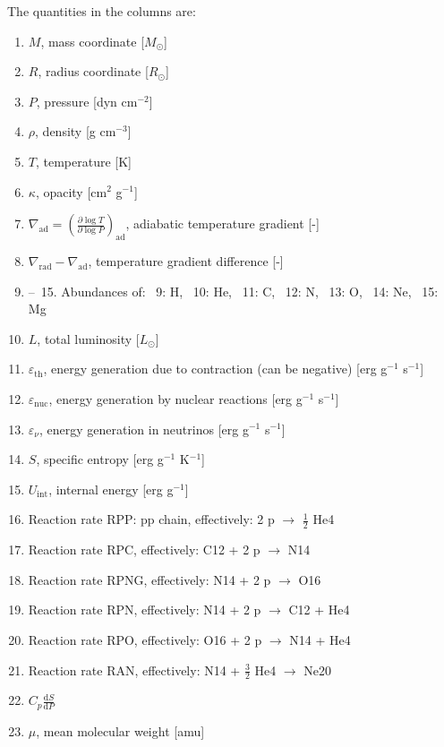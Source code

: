 The quantities in the columns are:
\begin{enumerate}
\item $M$, mass coordinate [$M_\odot$] 
\item $R$, radius coordinate [$R_\odot$] 
\item $P$, pressure [dyn cm$^{-2}$] 
\item $\rho$, density [g cm$^{-3}$]
\item $T$, temperature [K]
\item $\kappa$, opacity [cm$^2$ g$^{-1}$] 
\item $\nabla_\mathrm{ad} = \left(\frac{\partial\log T}{\partial\log P}\right)_\mathrm{ad}$, adiabatic temperature gradient  [-] 
\item $\nabla_\mathrm{rad}-\nabla_\mathrm{ad}$, temperature gradient difference [-]
\item-- \,15. Abundances of:~ 9: H,~ 10: He,~ 11: C,~ 12: N,~ 13: O,~ 14: Ne,~ 15: Mg

\setcounter{enumi}{15}
\item $L$, total luminosity [$L_\odot$]
\item $\varepsilon_\mathrm{th}$, energy generation due to contraction (can be negative) [erg g$^{-1}$ s$^{-1}$]
\item $\varepsilon_\mathrm{nuc}$, energy generation by nuclear reactions [erg g$^{-1}$ s$^{-1}$]
\item $\varepsilon_\nu$, energy generation in neutrinos [erg g$^{-1}$ s$^{-1}$]

\item $S$, specific entropy [erg g$^{-1}$ K$^{-1}$]
\item $U_\mathrm{int}$, internal energy [erg g$^{-1}$]  %
\item Reaction rate RPP: pp chain, effectively: 2 p $\rightarrow$ $\frac{1}{2}$ He4
\item Reaction rate RPC, effectively: C12 + 2 p $\rightarrow$ N14
\item Reaction rate RPNG, effectively: N14 + 2 p $\rightarrow$ O16
\item Reaction rate RPN, effectively: N14 + 2 p $\rightarrow$ C12 + He4
\item Reaction rate RPO, effectively: O16 + 2 p $\rightarrow$ N14 + He4
\item Reaction rate RAN, effectively: N14 + $\frac{3}{2}$ He4 $\rightarrow$ Ne20
\item $C_p \frac{\mathrm{d}S}{\mathrm{d}P}$
\item $\mu$, mean molecular weight [amu]


\end{enumerate}
